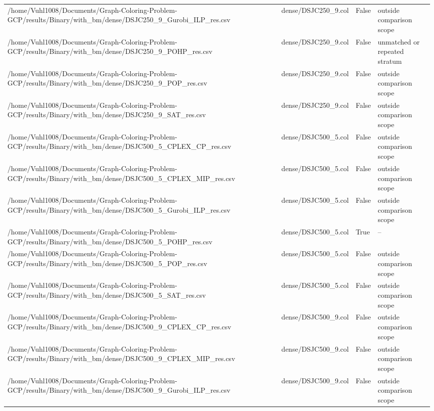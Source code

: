 \begin{table}[htbp]
\begin{tabular}{llll}
/home/Vuhl1008/Documents/Graph-Coloring-Problem-GCP/results/Binary/with\_bm/dense/DSJC250\_9\_Gurobi\_ILP\_res.csv & dense/DSJC250\_9.col & False & outside comparison scope \\
/home/Vuhl1008/Documents/Graph-Coloring-Problem-GCP/results/Binary/with\_bm/dense/DSJC250\_9\_POHP\_res.csv & dense/DSJC250\_9.col & False & unmatched or repeated stratum \\
/home/Vuhl1008/Documents/Graph-Coloring-Problem-GCP/results/Binary/with\_bm/dense/DSJC250\_9\_POP\_res.csv & dense/DSJC250\_9.col & False & outside comparison scope \\
/home/Vuhl1008/Documents/Graph-Coloring-Problem-GCP/results/Binary/with\_bm/dense/DSJC250\_9\_SAT\_res.csv & dense/DSJC250\_9.col & False & outside comparison scope \\
/home/Vuhl1008/Documents/Graph-Coloring-Problem-GCP/results/Binary/with\_bm/dense/DSJC500\_5\_CPLEX\_CP\_res.csv & dense/DSJC500\_5.col & False & outside comparison scope \\
/home/Vuhl1008/Documents/Graph-Coloring-Problem-GCP/results/Binary/with\_bm/dense/DSJC500\_5\_CPLEX\_MIP\_res.csv & dense/DSJC500\_5.col & False & outside comparison scope \\
/home/Vuhl1008/Documents/Graph-Coloring-Problem-GCP/results/Binary/with\_bm/dense/DSJC500\_5\_Gurobi\_ILP\_res.csv & dense/DSJC500\_5.col & False & outside comparison scope \\
/home/Vuhl1008/Documents/Graph-Coloring-Problem-GCP/results/Binary/with\_bm/dense/DSJC500\_5\_POHP\_res.csv & dense/DSJC500\_5.col & True & -- \\
/home/Vuhl1008/Documents/Graph-Coloring-Problem-GCP/results/Binary/with\_bm/dense/DSJC500\_5\_POP\_res.csv & dense/DSJC500\_5.col & False & outside comparison scope \\
/home/Vuhl1008/Documents/Graph-Coloring-Problem-GCP/results/Binary/with\_bm/dense/DSJC500\_5\_SAT\_res.csv & dense/DSJC500\_5.col & False & outside comparison scope \\
/home/Vuhl1008/Documents/Graph-Coloring-Problem-GCP/results/Binary/with\_bm/dense/DSJC500\_9\_CPLEX\_CP\_res.csv & dense/DSJC500\_9.col & False & outside comparison scope \\
/home/Vuhl1008/Documents/Graph-Coloring-Problem-GCP/results/Binary/with\_bm/dense/DSJC500\_9\_CPLEX\_MIP\_res.csv & dense/DSJC500\_9.col & False & outside comparison scope \\
/home/Vuhl1008/Documents/Graph-Coloring-Problem-GCP/results/Binary/with\_bm/dense/DSJC500\_9\_Gurobi\_ILP\_res.csv & dense/DSJC500\_9.col & False & outside comparison scope \\

\end{tabular}
\end{table}
